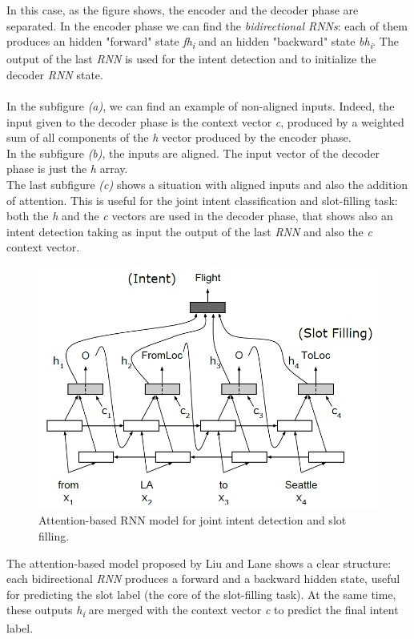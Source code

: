 \documentclass[a4paper,12pt]{report}
\begin{document}
	In this case, as the figure shows, the encoder and the decoder phase are separated. In the encoder phase we can find the \textit{bidirectional RNNs}: each of them produces an hidden "forward" state \textit{fh\textsubscript{i}} and an hidden "backward" state \textit{bh\textsubscript{i}}. The output of the last \textit{RNN} is used for the intent detection and to initialize the decoder \textit{RNN} state.\\\\
	In the subfigure \textit{(a)}, we can find an example of non-aligned inputs. Indeed, the input given to the decoder phase is the context vector \textit{c}, produced by a weighted sum of all components of the \textit{h} vector produced by the encoder phase.\\
	In the subfigure \textit{(b)}, the inputs are aligned. The input vector of the decoder phase is just the \textit{h} array.\\
	The last subfigure \textit{(c)} shows a situation with aligned inputs and also the addition of attention. This is useful for the joint intent classification and slot-filling task: both the \textit{h} and the \textit{c} vectors are used in the decoder phase, that shows also an intent detection taking as input the output of the last \textit{RNN} and also the \textit{c} context vector.
	\begin{figure}[H]
		\centering
		\includegraphics[scale=0.4]{alt2}
		\caption{Attention-based RNN model for joint intent detection
			and slot filling.}
	\end{figure}
	The attention-based model proposed by Liu and Lane shows a clear structure: each bidirectional \textit{RNN} produces a forward and a backward hidden state, useful for predicting the slot label (the core of the slot-filling task). At the same time, these outputs \textit{h\textsubscript{i}} are merged with the context vector \textit{c} to predict the final intent label.
\end{document}
